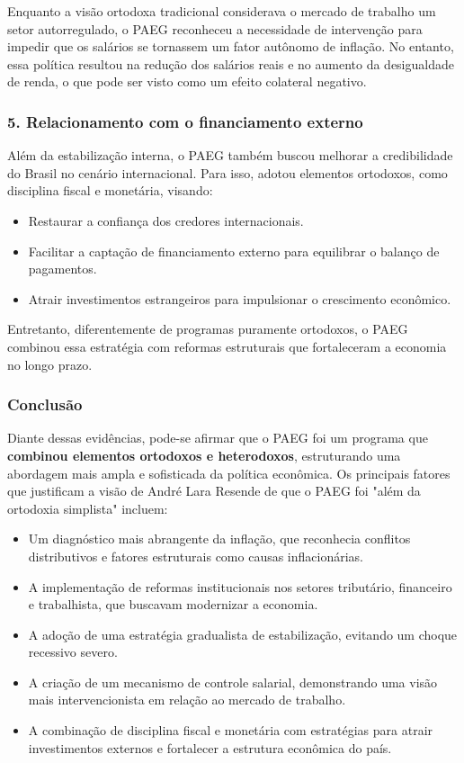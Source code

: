 \documentclass[a4paper,12pt]{article}[abntex2]
\begin{document}
Enquanto a visão ortodoxa tradicional considerava o mercado de trabalho um setor autorregulado, o PAEG reconheceu a necessidade de intervenção para impedir que os salários se tornassem um fator autônomo de inflação. No entanto, essa política resultou na redução dos salários reais e no aumento da desigualdade de renda, o que pode ser visto como um efeito colateral negativo.

\subsubsection{5. Relacionamento com o financiamento externo}
Além da estabilização interna, o PAEG também buscou melhorar a credibilidade do Brasil no cenário internacional. Para isso, adotou elementos ortodoxos, como disciplina fiscal e monetária, visando:
\begin{itemize}
    \item Restaurar a confiança dos credores internacionais.
    \item Facilitar a captação de financiamento externo para equilibrar o balanço de pagamentos.
    \item Atrair investimentos estrangeiros para impulsionar o crescimento econômico.
\end{itemize}

Entretanto, diferentemente de programas puramente ortodoxos, o PAEG combinou essa estratégia com reformas estruturais que fortaleceram a economia no longo prazo.

\subsubsection{Conclusão}
Diante dessas evidências, pode-se afirmar que o PAEG foi um programa que \textbf{combinou elementos ortodoxos e heterodoxos}, estruturando uma abordagem mais ampla e sofisticada da política econômica. Os principais fatores que justificam a visão de André Lara Resende de que o PAEG foi "além da ortodoxia simplista" incluem:
\begin{itemize}
    \item Um diagnóstico mais abrangente da inflação, que reconhecia conflitos distributivos e fatores estruturais como causas inflacionárias.
    \item A implementação de reformas institucionais nos setores tributário, financeiro e trabalhista, que buscavam modernizar a economia.
    \item A adoção de uma estratégia gradualista de estabilização, evitando um choque recessivo severo.
    \item A criação de um mecanismo de controle salarial, demonstrando uma visão mais intervencionista em relação ao mercado de trabalho.
    \item A combinação de disciplina fiscal e monetária com estratégias para atrair investimentos externos e fortalecer a estrutura econômica do país.
\end{itemize}
\end{document}
